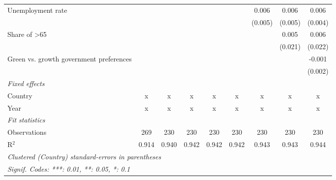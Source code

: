\begin{table}[htbp]
\begin{tabular}{lcccccccc}
      Unemployment rate                                &              &              &         &         &         & 0.006   & 0.006   & 0.006\\   
                                                       &              &              &         &         &         & (0.005) & (0.005) & (0.004)\\   
      Share of >65                                     &              &              &         &         &         &         & 0.005   & 0.006\\   
                                                       &              &              &         &         &         &         & (0.021) & (0.022)\\   
      Green vs. growth government preferences          &              &              &         &         &         &         &         & -0.001\\   
                                                       &              &              &         &         &         &         &         & (0.002)\\   
      \emph{Fixed effects}\\
      Country                                          & x            & x            & x       & x       & x       & x       & x       & x\\  
      Year                                             & x            & x            & x       & x       & x       & x       & x       & x\\  
      \midrule \emph{Fit statistics}\\
      Observations                                     & 269          & 230          & 230     & 230     & 230     & 230     & 230     & 230\\  
      R$^2$                                            & 0.914        & 0.940        & 0.942   & 0.942   & 0.942   & 0.943   & 0.943   & 0.944\\  
      \midrule
      \multicolumn{9}{l}{\emph{Clustered (Country) standard-errors in parentheses}}\\
      \multicolumn{9}{l}{\emph{Signif. Codes: ***: 0.01, **: 0.05, *: 0.1}}\\
   \end{tabular}
\end{table}


